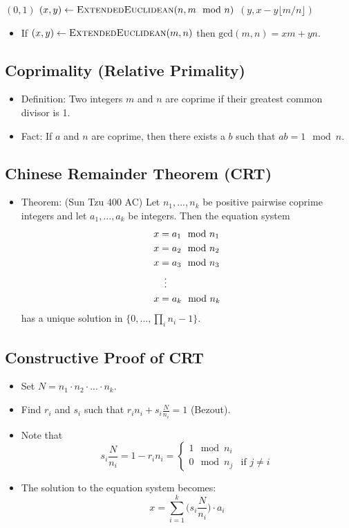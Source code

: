 \documentclass[a4paper]{scrartcl}
\begin{document}
\begin{algorithmic}[1]
\State \Return $(0,1)$
\Else
\State $(x,y) \gets \Call{ExtendedEuclidean}{n, m \mod n}$
\State \Return $(y, x - y \lfloor m / n \rfloor)$
\EndIf
\EndProcedure
\end{algorithmic}

\begin{itemize}
\item If $(x,y) \gets \Call{ExtendedEuclidean}{m,n}$ then  $\text{gcd}(m,n) = xm + yn$.
\end{itemize}

\subsection*{Coprimality (Relative Primality)}

\begin{itemize}
\item Definition: Two integers $m$ and $n$ are coprime if their greatest common divisor is 1.
\item Fact: If $a$ and $n$ are coprime, then there exists a $b$ such that $ab = 1 \mod n$.
\end{itemize}

\subsection*{Chinese Remainder Theorem (CRT)}

\begin{itemize}
\item Theorem: (Sun Tzu 400 AC) Let $n_1,...,n_k$ be positive pairwise coprime integers and let $a_1,...,a_k$ be integers. Then the equation system
\begin{align*}
x &= a_1 \mod n_1\\
x &= a_2 \mod n_2\\
x &= a_3 \mod n_3\\
&\vdotswithin{=} \\
x &= a_k \mod n_k
\end{align*}
has a unique solution in $\{0,...,\prod_{i}n_i-1\}$.
\end{itemize}

\subsection*{Constructive Proof of CRT}

\begin{itemize}
\item Set $N = n_1 \cdot n_2 \cdot ... \cdot n_k$.
\item Find $r_i$ and $s_i$ such that $r_i n_i + s_i \frac{N}{n_i} = 1$ (Bezout).
\item Note that $$s_i\frac{N}{n_i} = 1 - r_i n_i = 
\begin{cases}
1 \mod n_i \\
0 \mod n_j & \text{if $j \neq i$}
\end{cases}$$
\item The solution to the equation system becomes:
$$x = \sum_{i=1}^{k}\bigg(s_i\frac{N}{n_i}\bigg) \cdot a_i$$
\end{itemize}
\end{document}
